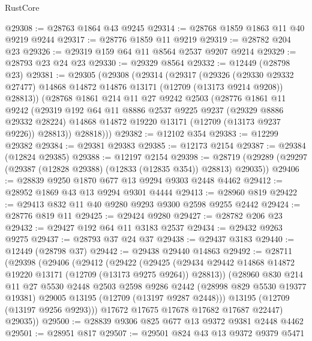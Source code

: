\begin{lexlean}{RustCore}
\begin{coremodule}
@29308 := @28763 @1864 @43 @9245
@29314 := @28768 @1859 @1863 @11 @40 @9219 @9244
@29317 := @28776 @1859 @11 @9219
@29319 := @28782 @204 @23
@29326 := @29319 @159 @64 @11 @8564 @2537 @9207 @9214
@29329 := @28793 @23 @24 @23
@29330 := @29329 @8564
@29332 := @12449 (@28798 @23)
@29381 := @29305
    (@29308
      (@29314
        (@29317
          (@29326
            (@29330 @29332 @27477)
            @14868
            @14872
            @14876
            @13171
            (@12709 (@13173 @9214 @9208))
            @28813))
        (@28768
          @1861
          @214
          @11
          @27
          @9242
          @2503
          (@28776
            @1861
            @11
            @9242
            (@29319
              @192
              @64
              @11
              @8886
              @2537
              @9225
              @9237
              (@29329 @8886 @29332 @28224)
              @14868
              @14872
              @19220
              @13171
              (@12709 (@13173 @9237 @9226))
              @28813))
          @28818)))
@29382 := @12102 @354
@29383 := @12299 @29382
@29384 := @29381 @29383
@29385 := @12173 @2154
@29387 := @29384 (@12824 @29385)
@29388 := @12197 @2154
@29398 := @28719 (@29289 (@29297 (@29387 (@12828 @29388) (@12833 (@12835 @354)) @28813) @29035))
@29406 := @28839 @9250 @1870 @677 @13 @9294 @9303 @2448 @4462
@29412 := @28952 @1869 @43 @13 @9294 @9301 @4444
@29413 := @28960 @819
@29422 := @29413 @832 @11 @40 @9280 @9293 @9300 @2598 @9255 @2442
@29424 := @28776 @819 @11
@29425 := @29424 @9280
@29427 := @28782 @206 @23
@29432 := @29427 @192 @64 @11 @3183 @2537
@29434 := @29432 @9263 @9275
@29437 := @28793 @37 @24 @37
@29438 := @29437 @3183
@29440 := @12449 (@28798 @37)
@29442 := @29438 @29440 @14863
@29492 := @28711
    (@29398
      (@29406
        (@29412
          (@29422
            (@29425
              (@29434 @29442 @14868 @14872 @19220 @13171 (@12709 (@13173 @9275 @9264)) @28813))
            (@28960
              @830
              @214
              @11
              @27
              @5530
              @2448
              @2503
              @2598
              @9286
              @2442
              (@28998 @829 @5530 @19377 @19381)
              @29005
              @13195
              (@12709 (@13197 @9287 @2448)))
            @13195
            (@12709 (@13197 @9256 @9293)))
          @17672
          @17675
          @17678
          @17682
          @17687
          @22447)
        @29035))
@29500 := @28839 @9306 @825 @677 @13 @9372 @9381 @2448 @4462
@29501 := @28951 @817
@29507 := @29501 @824 @43 @13 @9372 @9379 @5471

\end{coremodule}
\end{lexlean}
